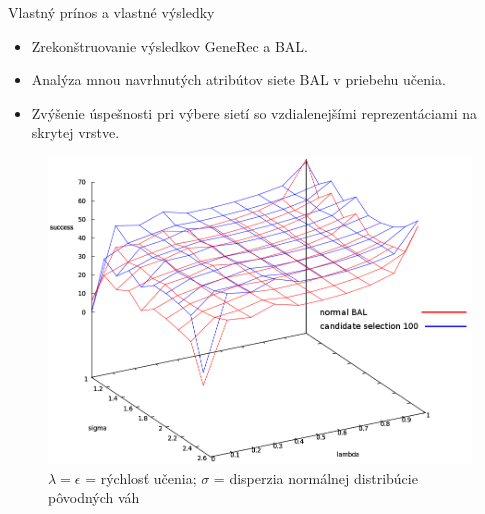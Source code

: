 \documentclass[xcolor=dvipsnames]{beamer}
\begin{document}
\begin{frame}{Vlastný prínos a vlastné výsledky}
  \begin{itemize}
    \item Zrekonštruovanie výsledkov GeneRec a BAL. 
    \item Analýza mnou navrhnutých atribútov siete BAL v priebehu učenia. 
    \item Zvýšenie úspešnosti pri výbere sietí so vzdialenejšími reprezentáciami na skrytej vrstve. 
  \end{itemize} 
  
  \begin{figure}[h!]  
    \centering
    \vspace{-8pt} 
    \includegraphics[scale=0.20]{img/compare_normal_and_hdist2.png}
    \caption{{\tiny $\lambda = \epsilon$ = rýchlosť učenia; $\sigma$ = disperzia normálnej distribúcie pôvodných váh}} 
  \end{figure} 
\end{frame}

\end{document}
